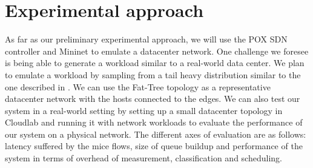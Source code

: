 \section{Experimental approach}
As far as our preliminary experimental approach, we will use the POX SDN controller and Mininet to emulate a datacenter network. One challenge we foresee is being able to generate a workload similar to a real-world data center. We plan to emulate a workload by sampling from a tail heavy distribution similar to the one described in \cite{dctcp}. We can use the Fat-Tree topology \cite{fattree} as a representative datacenter network with the hosts connected to the edges. We can also test our system in a real-world setting by setting up a small datacenter topology in Cloudlab and running it with network workloads to evaluate the performance of our system on a physical network.  The different axes of evaluation are as follows: latency suffered by the mice flows, size of queue buildup and performance of the system in terms of overhead of measurement, classification and scheduling. 